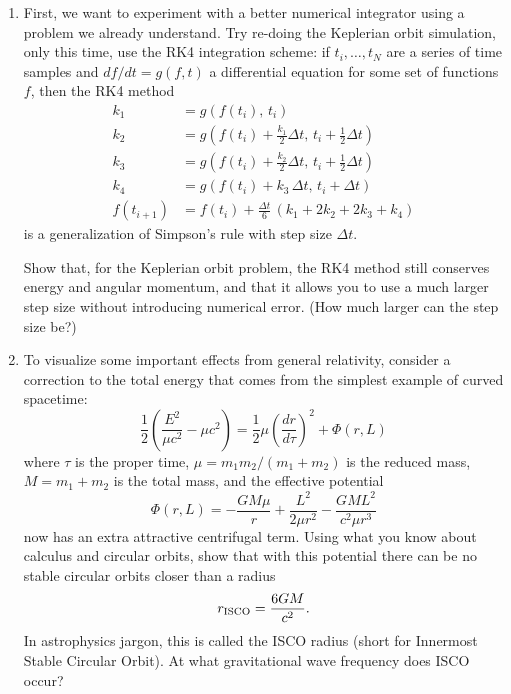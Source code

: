 \documentclass[11pt]{article}
\begin{document}
\begin{enumerate}

\item First, we want to experiment with a better numerical integrator using a problem we already understand. Try re-doing the Keplerian orbit simulation, only this time, use the RK4 integration scheme: if $t_i, \dots, t_N$ are a series of time samples and $df/dt = g(f, t)$ a differential equation for some set of functions $f$, then the RK4 method
\begin{align*}
k_1 &= g(f(t_i), \, t_i) \\
k_2 &= g\left(f(t_i) + \frac{k_1}{2}\Delta t, \, t_i + \frac{1}{2}\Delta t\right) \\
k_3 &= g\left(f(t_i) + \frac{k_2}{2}\Delta t, \, t_i + \frac{1}{2}\Delta t\right) \\
k_4 &= g(f(t_i) + k_3\,\Delta t, \, t_i + \Delta t) \\
f(t_{i+1}) &= f(t_i) + \frac{\Delta t}{6}\,\left(k_1 + 2k_2 + 2k_3 + k_4\right)
\end{align*}
is a generalization of Simpson's rule with step size $\Delta t$.

\hspace{15pt} Show that, for the Keplerian orbit problem, the RK4 method still conserves energy and angular momentum, and that it allows you to use a much larger step size without introducing numerical error. (How much larger can the step size be?)

\item To visualize some important effects from general relativity, consider a correction to the total energy that comes from the simplest example of curved spacetime:
\begin{equation}
\frac{1}{2} \left(\frac{E^2}{\mu c^2} - \mu c^2\right) = \frac{1}{2}\mu\left(\frac{dr}{d\tau}\right)^2 + \Phi(r, L)
\end{equation}
where $\tau$ is the proper time, $\mu = m_1 m_2/(m_1 + m_2)$ is the reduced mass, $M = m_1 + m_2$ is the total mass, and the effective potential
\begin{equation}\label{eq:potential}
\Phi(r, L) = -\frac{GM\mu}{r} + \frac{L^2}{2\mu r^2} - \frac{GML^2}{c^2\mu r^3}
\end{equation}
now has an extra attractive centrifugal term. Using what you know about calculus and circular orbits, show that with this potential there can be no stable circular orbits closer than a radius
\begin{equation}\label{eq:ISCO}
r_{\rm ISCO} = \frac{6GM}{c^2}.
\end{equation}
In astrophysics jargon, this is called the ISCO radius (short for Innermost Stable Circular Orbit). At what gravitational wave frequency does ISCO occur?


\end{enumerate}
\end{document}
